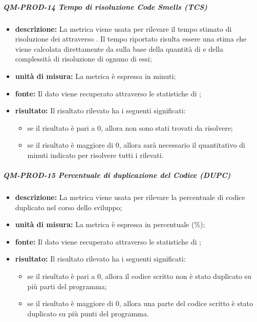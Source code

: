 			\subparagraph{QM-PROD-14 Tempo di risoluzione Code Smells (TCS)}
			\begin{itemize}
      			\item \textbf{descrizione: }
					La metrica viene usata per rilevare il tempo stimato di risoluzione dei  attraverso . Il tempo riportato risulta essere una stima che viene calcolata direttamente da  sulla base della quantità di  e della complessità di risoluzione di ognuno di essi;
				\item \textbf{unità di misura: }
					La metrica è espressa in minuti;
				\item \textbf{fonte: }
					Il dato viene recuperato attraverso le statistiche di ;
				\item \textbf{risultato: }
					Il risultato rilevato ha i seguenti significati:
					\begin{itemize}
						\item se il risultato è pari a 0, allora non sono stati trovati  da risolvere;
						\item se il risultato è maggiore di 0, allora sarà necessario il quantitativo di minuti indicato per risolvere tutti i  rilevati.
					\end{itemize}
			\end{itemize}
			\subparagraph{QM-PROD-15 Percentuale di duplicazione del Codice (DUPC)}
			\begin{itemize}
      			\item \textbf{descrizione: }
					La metrica viene usata per rilevare la percentuale di codice duplicato nel corso dello sviluppo;
				\item \textbf{unità di misura: }
					La metrica è espressa in percentuale (\%);
				\item \textbf{fonte: }
					Il dato viene recuperato attraverso le statistiche di ;
				\item \textbf{risultato: }
					Il risultato rilevato ha i seguenti significati:
					\begin{itemize}
						\item se il risultato è pari a 0, allora il codice scritto non è stato duplicato su più parti del programma;
						\item se il risultato è maggiore di 0, allora una parte del codice scritto è stato duplicato su più punti del programma.
					\end{itemize}
			\end{itemize}
